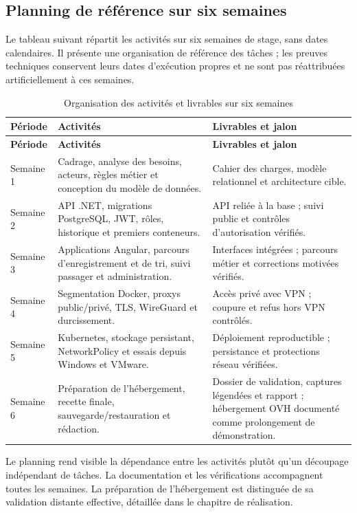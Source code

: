 \documentclass[11pt]{extarticle}
\begin{document}
\subsection{Planning de référence sur six semaines}
Le tableau suivant répartit les activités sur six semaines de stage, sans dates calendaires. Il présente une organisation de référence des tâches ; les preuves techniques conservent leurs dates d'exécution propres et ne sont pas réattribuées artificiellement à ces semaines.
\begin{longtable}{p{1.7cm}p{6.5cm}p{5.2cm}}
\caption{Organisation des activités et livrables sur six semaines}\label{tab:planning-stage}\\
\toprule\textbf{Période} & \textbf{Activités} & \textbf{Livrables et jalon}\\\midrule\endfirsthead
\toprule\textbf{Période} & \textbf{Activités} & \textbf{Livrables et jalon}\\\midrule\endhead
Semaine 1 & Cadrage, analyse des besoins, acteurs, règles métier et conception du modèle de données. & Cahier des charges, modèle relationnel et architecture cible.\\
Semaine 2 & API .NET, migrations PostgreSQL, JWT, rôles, historique et premiers conteneurs. & API reliée à la base ; suivi public et contrôles d'autorisation vérifiés.\\
Semaine 3 & Applications Angular, parcours d'enregistrement et de tri, suivi passager et administration. & Interfaces intégrées ; parcours métier et corrections motivées vérifiés.\\
Semaine 4 & Segmentation Docker, proxys public/privé, TLS, WireGuard et durcissement. & Accès privé avec VPN ; coupure et refus hors VPN contrôlés.\\
Semaine 5 & Kubernetes, stockage persistant, NetworkPolicy et essais depuis Windows et VMware. & Déploiement reproductible ; persistance et protections réseau vérifiées.\\
Semaine 6 & Préparation de l'hébergement, recette finale, sauvegarde/restauration et rédaction. & Dossier de validation, captures légendées et rapport ; hébergement OVH documenté comme prolongement de démonstration.\\\bottomrule
\end{longtable}
Le planning rend visible la dépendance entre les activités plutôt qu'un découpage indépendant de tâches. La documentation et les vérifications accompagnent toutes les semaines. La préparation de l'hébergement est distinguée de sa validation distante effective, détaillée dans le chapitre de réalisation.
\end{document}
